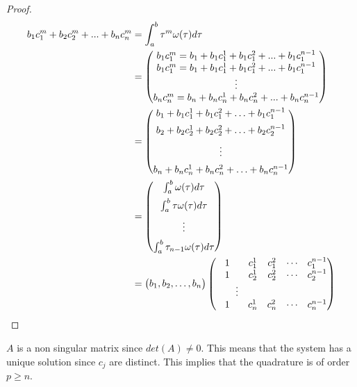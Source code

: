 \documentclass[12pt,a4paper]{article}
\begin{document}
\begin{proof}
\begin{align*}
b_1c_1^m + b_2c_2^m + ... + b_nc_n^m &= \int_a^b\tau^m \omega(\tau)d\tau \\
&= \begin{pmatrix}
b_1c_1^m = b_1 + b_1c_1^1 + b_1c_1^2 + ... + b_1c_1^{n-1} \\
b_1c_1^m = b_1 + b_1c_1^1 + b_1c_1^2 + ... + b_1c_1^{n-1} \\
\vdots     \\       
b_nc_n^m = b_n + b_nc_n^1 + b_nc_n^2 + ... + b_nc_n^{n-1}
\end{pmatrix} \\
&= \begin{pmatrix} 
b_1 + b_1c_1^1 + b_1c_1^2 + \ldots + b_1c_1^{n-1} \vspace{5pt} \\
b_2 + b_2c_2^1 + b_2c_2^2 + \ldots + b_2c_2^{n-1} \vspace{5pt} \\
\vdots \vspace{5pt} \\
b_n + b_nc_n^1 + b_nc_n^2 + \ldots + b_nc_n^{n-1}
\end{pmatrix} \\
&=\begin{pmatrix}
\int_a^b \omega (\tau) d \tau \vspace{5pt} \\
\int_a^b \tau \omega (\tau) d \tau \vspace{5pt} \\
\vdots \vspace{5pt} \\
\int_a^b \tau_{n-1} \omega (\tau) d \tau 
\end{pmatrix} \\
&= \begin{pmatrix}
b_1, b_2, \ldots , b_n
\end{pmatrix}
\begin{pmatrix}
1& c_1^1&c_1^2&\cdots&c_1^{n-1}\\
1& c_2^1&c_2^2&\cdots&c_2^{n-1}\\
\qquad  \vdots\\
1& c_n^1&c_n^2&\cdots&c_n^{n-1}\\
\end{pmatrix}
\end{align*}

\end{proof}

\noindent
$A$ is a non singular matrix  since $det(A) \neq 0$. This means that the system has a unique solution since $c_j$ are distinct. This implies that the quadrature is of order $p \geq n$.
\end{document}
